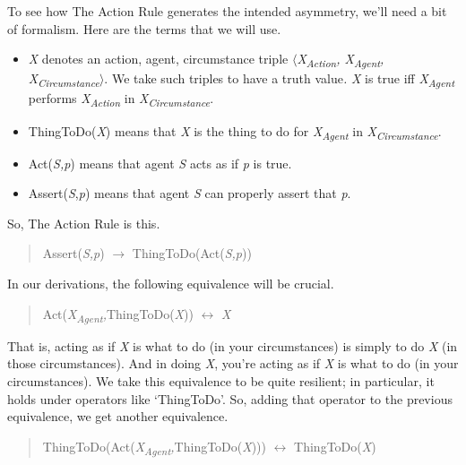To see how The Action Rule generates the intended asymmetry, we'll need a bit of formalism. Here are the terms that we will use.

\begin{itemize}
\item \textit{X} denotes an action, agent, circumstance triple $\langle$\textit{X}\textit{\textsubscript{Action}}\textit{, X}\textit{\textsubscript{Agent}}\textit{, X}\textit{\textsubscript{Circumstance}}$\rangle$. We take such triples to have a truth value\textit{.} \textit{X} is true iff \textit{X}\textit{\textsubscript{Agent}} performs \textit{X}\textit{\textsubscript{Action}} in \textit{X}\textit{\textsubscript{Circumstance}}.
\item ThingToDo(\textit{X}) means that \textit{X} is the thing to do for \textit{X}\textit{\textsubscript{Agent}} in \textit{X}\textit{\textsubscript{Circumstance}}.
\item Act(\textit{S,p}) means that agent \textit{S} acts as if \textit{p} is true.
\item Assert(\textit{S},\textit{p}) means that agent \textit{S} can properly assert that \textit{p}.
\end{itemize}

\noindent So, The Action Rule is this.

\begin{quote}
Assert(\textit{S,p}) ${\rightarrow}$ ThingToDo(Act(\textit{S,p}))
\end{quote}

\noindent In our derivations, the following equivalence will be crucial.

\begin{quote}
Act(\textit{X}\textit{\textsubscript{Agent}}\textit{,}ThingToDo(\textit{X})) ${\leftrightarrow}$ \textit{X}
\end{quote}

\noindent That is, acting as if \textit{X} is what to do (in your circumstances) is simply to do \textit{X }(in those circumstances). And in doing \textit{X}, you're acting as if \textit{X} is what to do (in your circumstances). We take this equivalence to be quite resilient; in particular, it holds under operators like `ThingToDo'. So, adding that operator to the previous equivalence, we get another equivalence.

\begin{quote}
ThingToDo(Act(\textit{X}\textit{\textsubscript{Agent}}\textit{,}ThingToDo(\textit{X}))) ${\leftrightarrow}$ ThingToDo(\textit{X})
\end{quote}

